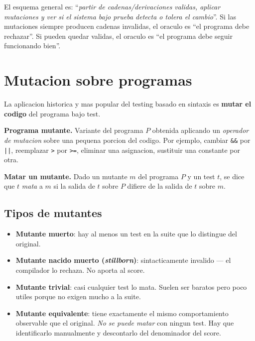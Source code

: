 \documentclass[12pt,a4paper]{article}
\begin{document}
\begin{ideabox}
El esquema general es: ``\textit{partir de cadenas/derivaciones validas, aplicar mutaciones y
ver si el sistema bajo prueba detecta o tolera el cambio}''. Si las mutaciones siempre
producen cadenas invalidas, el oraculo es ``el programa debe rechazar''. Si pueden quedar
validas, el oraculo es ``el programa debe seguir funcionando bien''.
\end{ideabox}

\section{Mutacion sobre programas}

La aplicacion historica y mas popular del testing basado en sintaxis es \textbf{mutar el
codigo} del programa bajo test.

\begin{definicionbox}
\textbf{Programa mutante.} Variante del programa $P$ obtenida aplicando un \emph{operador de
mutacion} sobre una pequena porcion del codigo. Por ejemplo, cambiar \texttt{\&\&} por
\texttt{||}, reemplazar \texttt{>} por \texttt{>=}, eliminar una asignacion, sustituir una
constante por otra.
\end{definicionbox}

\begin{definicionbox}
\textbf{Matar un mutante.} Dado un mutante $m$ del programa $P$ y un test $t$, se dice que $t$
\emph{mata} a $m$ si la salida de $t$ sobre $P$ difiere de la salida de $t$ sobre $m$.
\end{definicionbox}

\subsection{Tipos de mutantes}

\begin{itemize}
  \item \textbf{Mutante muerto}: hay al menos un test en la suite que lo distingue del
  original.
  \item \textbf{Mutante nacido muerto (\emph{stillborn})}: sintacticamente invalido --- el
  compilador lo rechaza. No aporta al score.
  \item \textbf{Mutante trivial}: casi cualquier test lo mata. Suelen ser baratos pero poco
  utiles porque no exigen mucho a la suite.
  \item \textbf{Mutante equivalente}: tiene exactamente el mismo comportamiento observable que
  el original. \emph{No se puede matar} con ningun test. Hay que identificarlo manualmente y
  descontarlo del denominador del score.
\end{itemize}
\end{document}

